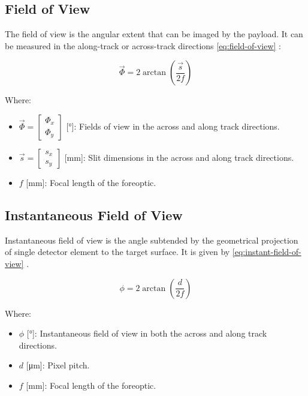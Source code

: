 \documentclass{article}
\begin{document}
\subsection{Field of View}
The field of view is the angular extent that can be imaged by the payload. It can be measured in the along-track or across-track directions \eqref{eq:field-of-view} \cite{specim-fov,wiki-aov,wiki-fov}:

\begin{equation} \label{eq:field-of-view}
\vec{\Phi} = 2\arctan{\left( \frac{\vec{s}}{2f} \right)}
\end{equation}

Where:
\begin{itemize}[label={}]
    \item $\vec{\Phi} = \begin{bmatrix} \Phi_x \\ \Phi_y \end{bmatrix}$ [\si{\degree}]: Fields of view in the across and along track directions.
    \item $\vec{s} = \begin{bmatrix} s_x \\ s_y \end{bmatrix}$ [\si{\mm}]: Slit dimensions in the across and along track directions.
    \item $f$ [\si{\mm}]: Focal length of the foreoptic.
\end{itemize}

\subsection{Instantaneous Field of View}
Instantaneous field of view is the angle subtended by the geometrical projection of single detector element to the target surface. It is given by \eqref{eq:instant-field-of-view} \cite{specim-fov}.

\begin{equation} \label{eq:instant-field-of-view}
\phi = 2\arctan{\left( \frac{d}{2f} \right)}
\end{equation}

Where:
\begin{itemize}[label={}]
    \item $\phi$ [\si{\degree}]: Instantaneous field of view in both the across and along track directions.
    \item $d$ [\si{\micro\m}]: Pixel pitch.
    \item $f$ [\si{\mm}]: Focal length of the foreoptic.
\end{itemize}
\end{document}
